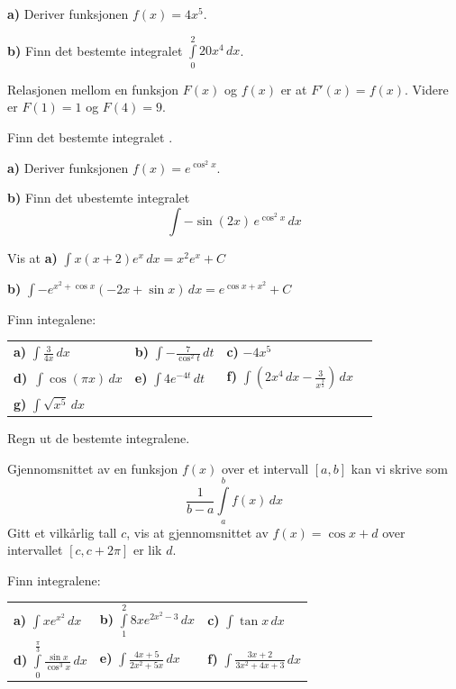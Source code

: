 




	
	
\opgt

\textbf{a)} Deriver funksjonen $ f(x)=4x^5 $.\os

\textbf{b)} Finn det bestemte integralet $ \int\limits_0^2 20 x^4 \, dx $.

Relasjonen mellom en funksjon $ F(x) $ og $f(x) $ er at $ F'(x)=f(x) $. Videre er $ F(1)=1 $ og $ F(4)=9 $.\os

Finn det bestemte integralet .

\textbf{a)} Deriver funksjonen $ f(x)=e^{\cos^2 x} $.\os

\textbf{b)} Finn det ubestemte integralet \[ \int -\sin (2x)\, e^{\cos^2 x}\,dx \]\vs\vs

Vis at\os
\textbf{a)} $\displaystyle \int x(x+2)e^x \,dx = x^2 e^x + C $ \os

\textbf{b)} $\displaystyle \int -e^{x^2+\cos x} (-2 x+\sin x)\,dx= e^{\cos x+x^2}+C  $

\nes

Finn integalene:\os
\begin{tabular}{@{}l l l l}	
\textbf{a)} $ \displaystyle \int \frac{3}{4 x} \,dx$ &\quad \textbf{b)} $ \displaystyle \int-\frac{7}{\cos^2 t}\,dt $ &\quad \textbf{c)} $ -4x^5 $ \\[20 pt]
\textbf{d)}\ $\displaystyle \int \cos(\pi x) \,dx$ & \quad
\textbf{e)} $\displaystyle \int 4e^{-4t} \,dt$ &\quad\textbf{f)} $ \displaystyle \int \left(2x^4\,dx - \frac{3}{x^{\frac{3}{2}}}\right) \,dx$ \\[20pt]
\textbf{g)} $\displaystyle \int \sqrt{x^5}\,dx $
\end{tabular} 
\newpage
{}
Regn ut de bestemte integralene.\os
{}

Gjennomsnittet av en funksjon $ f(x) $ over et intervall $ [a, b] $ kan vi skrive som
\[ \frac{1}{b-a}\int\limits_a^b f(x)\,dx \]
Gitt et vilkårlig tall $ c $, vis at gjennomsnittet av $f(x)=\cos x+d  $ over intervallet $ [c, c+2\pi] $ er lik $ d $. 

Finn integralene:\os

\begin{tabular}{@{}l l l}	
\textbf{a)} $\displaystyle \int xe^{x^2} \, dx  $ &\;\textbf{b)} $\displaystyle \int\limits_1^2 8xe^{2x^2-3}\,dx $ &\;\textbf{c)} $\displaystyle \int \tan x \, dx $ \\ \vspace{3pt} 
\textbf{d)} $ \displaystyle \int\limits_0^\frac{\pi}{3}\frac{\sin x}{\cos^3 x} \, dx $ &\;\textbf{e)} $ \displaystyle \int \frac{4x+5}{2x^2 + 5x}\,dx $
&\;\textbf{f)} $ \displaystyle \int \frac{3x+2}{3x^2 + 4x+3}\,dx $
\end{tabular} 


